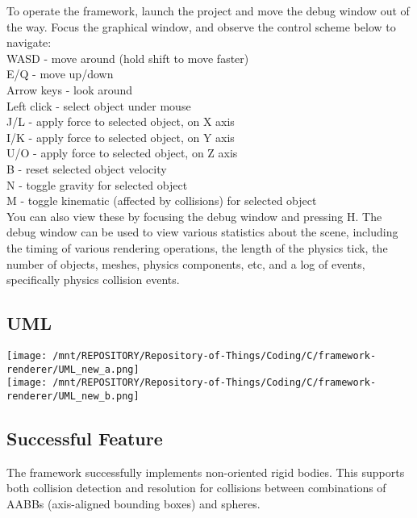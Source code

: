 \documentclass[
]{article}
\begin{document}
To operate the framework, launch the project and move the debug window
out of the way. Focus the graphical window, and observe the control
scheme below to navigate:\\
WASD - move around (hold shift to move faster)\\
E/Q - move up/down\\
Arrow keys - look around\\
Left click - select object under mouse\\
J/L - apply force to selected object, on X axis\\
I/K - apply force to selected object, on Y axis\\
U/O - apply force to selected object, on Z axis\\
B - reset selected object velocity\\
N - toggle gravity for selected object\\
M - toggle kinematic (affected by collisions) for selected object\\
You can also view these by focusing the debug window and pressing H. The
debug window can be used to view various statistics about the scene,
including the timing of various rendering operations, the length of the
physics tick, the number of objects, meshes, physics components, etc,
and a log of events, specifically physics collision events.

\subsection{UML}\label{uml}

\texttt{[image: /mnt/REPOSITORY/Repository-of-Things/Coding/C/framework-renderer/UML\_new\_a.png]}\\
\newline
\texttt{[image: /mnt/REPOSITORY/Repository-of-Things/Coding/C/framework-renderer/UML\_new\_b.png]}\\

\subsection{Successful Feature}\label{successful-feature}

The framework successfully implements non-oriented rigid bodies. This
supports both collision detection and resolution for collisions between
combinations of AABBs (axis-aligned bounding boxes) and spheres.
\end{document}
